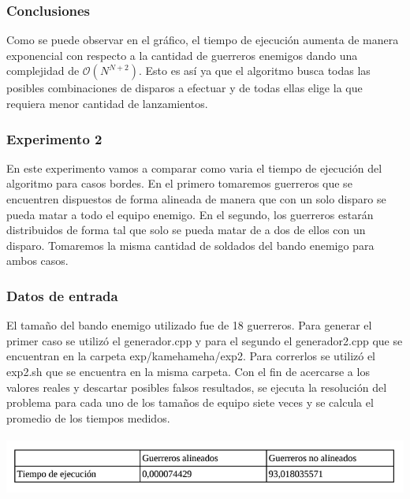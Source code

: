 		\subsubsection*{Conclusiones}\;

			Como se puede observar en el gráfico, el tiempo de ejecución aumenta de manera exponencial con respecto a la cantidad de guerreros enemigos dando una complejidad de $\mathcal{O}(N^{N+2})$. Esto es así ya que el algoritmo busca todas las posibles combinaciones de disparos a efectuar y de todas ellas elige la que requiera menor cantidad de lanzamientos. \;

		\;
		\;
		
    	\subsubsection*{Experimento 2}\;
    		En este experimento vamos a comparar como varia el tiempo de ejecución del algoritmo para casos bordes. En el primero tomaremos guerreros que se encuentren dispuestos de forma alineada de manera que con un solo disparo se pueda matar a todo el equipo enemigo. En el segundo, los guerreros estarán distribuidos de forma tal que solo se pueda matar de a dos de ellos con un disparo. Tomaremos la misma cantidad de soldados del bando enemigo para ambos casos. \;

    	\subsubsection*{Datos de entrada}\;
    		El tamaño del bando enemigo utilizado fue de 18 guerreros.
			Para generar el primer caso se utilizó el generador.cpp y para el segundo el generador2.cpp que se encuentran en la carpeta exp/kamehameha/exp2. Para correrlos se utilizó el exp2.sh que se encuentra en la misma carpeta.\;
			Con el fin de acercarse a los valores reales y descartar posibles falsos resultados, se ejecuta la resolución del problema para cada uno de los tamaños de equipo siete veces y se calcula el promedio de los tiempos medidos.\;

      	\includegraphics[height=2cm]{graficos/tabla.png}


